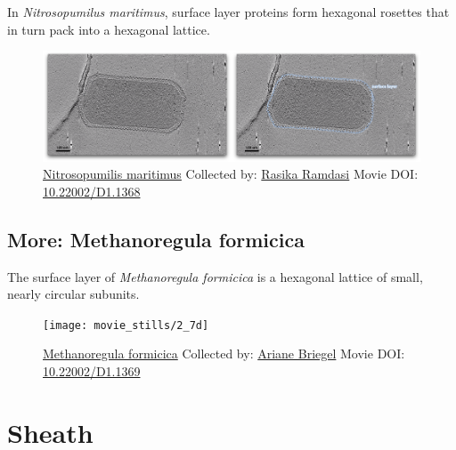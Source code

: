 \documentclass[]{tufte-book}
\begin{document}
In \emph{Nitrosopumilus maritimus}, surface layer proteins form
hexagonal rosettes that in turn pack into a hexagonal lattice.





\begin{figure}
\includegraphics{movie_stills/2_7c} \caption[\protect\hyperlink{tree}{Nitrosopumilis maritimus} Collected
by: \protect\hyperlink{rasika_ramdasi}{Rasika Ramdasi} Movie DOI:
\href{https://doi.org/10.22002/D1.1368}{10.22002/D1.1368}]{\protect\hyperlink{tree}{Nitrosopumilis maritimus} Collected
by: \protect\hyperlink{rasika_ramdasi}{Rasika Ramdasi} Movie DOI:
\href{https://doi.org/10.22002/D1.1368}{10.22002/D1.1368}}\label{fig:2-7c}
\end{figure}

\hypertarget{Methanoregula_formicica}{\subsection*{More: Methanoregula
formicica}\label{Methanoregula_formicica}}

The surface layer of \emph{Methanoregula formicica} is a hexagonal
lattice of small, nearly circular subunits.





\begin{figure}
\texttt{[image: movie\_stills/2\_7d]} \caption[\protect\hyperlink{tree}{Methanoregula formicica} Collected
by: \protect\hyperlink{ariane_briegel}{Ariane Briegel} Movie DOI:
\href{https://doi.org/10.22002/D1.1369}{10.22002/D1.1369}]{\protect\hyperlink{tree}{Methanoregula formicica} Collected
by: \protect\hyperlink{ariane_briegel}{Ariane Briegel} Movie DOI:
\href{https://doi.org/10.22002/D1.1369}{10.22002/D1.1369}}\label{fig:2-7d}
\end{figure}

\section{Sheath}\label{sheath}
\end{document}
